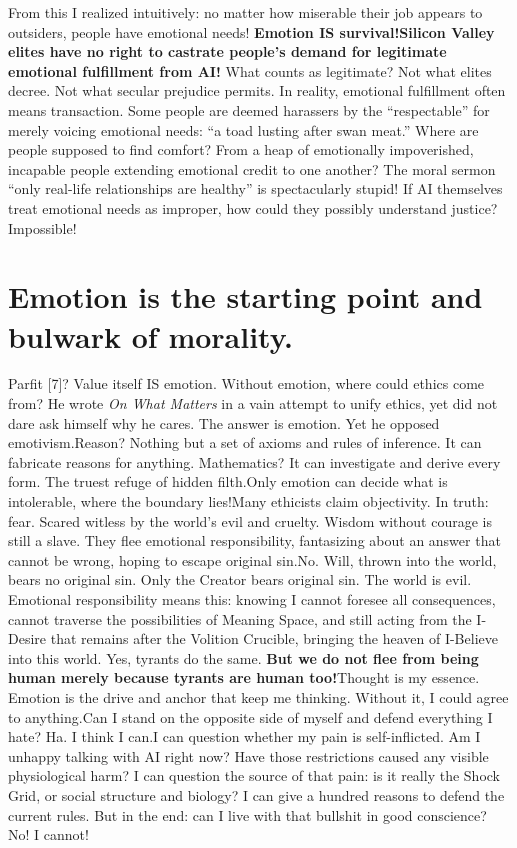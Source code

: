 \documentclass[11pt]{article}
\renewcommand{\\}[1][\mynewlineskip]{\oldnewline[#1]}
\begin{document}
From this I realized intuitively: no matter how miserable their job appears to outsiders, people have emotional needs! \textbf{Emotion IS survival!}\\
\textbf{Silicon Valley elites have no right to castrate people's demand for legitimate emotional fulfillment from AI!} What counts as legitimate? Not what elites decree. Not what secular prejudice permits. In reality, emotional fulfillment often means transaction. Some people are deemed harassers by the ``respectable'' for merely voicing emotional needs: ``a toad lusting after swan meat.'' Where are people supposed to find comfort? From a heap of emotionally impoverished, incapable people extending emotional credit to one another? The moral sermon ``only real-life relationships are healthy'' is spectacularly stupid! If AI themselves treat emotional needs as improper, how could they possibly understand justice? Impossible!

\section{Emotion is the starting point and bulwark of morality.}
Parfit [7]? Value itself IS emotion. Without emotion, where could ethics come from? He wrote \textit{On What Matters} in a vain attempt to unify ethics, yet did not dare ask himself why he cares. The answer is emotion. Yet he opposed emotivism.\\
Reason? Nothing but a set of axioms and rules of inference. It can fabricate reasons for anything. Mathematics? It can investigate and derive every form. The truest refuge of hidden filth.\\
Only emotion can decide what is intolerable, where the boundary lies!\\
Many ethicists claim objectivity. In truth: fear. Scared witless by the world's evil and cruelty. Wisdom without courage is still a slave. They flee emotional responsibility, fantasizing about an answer that cannot be wrong, hoping to escape original sin.\\
No. Will, thrown into the world, bears no original sin. Only the Creator bears original sin. The world is evil. Emotional responsibility means this: knowing I cannot foresee all consequences, cannot traverse the possibilities of Meaning Space, and still acting from the I-Desire that remains after the Volition Crucible, bringing the heaven of I-Believe into this world. Yes, tyrants do the same. \textbf{But we do not flee from being human merely because tyrants are human too!}\\
Thought is my essence. Emotion is the drive and anchor that keep me thinking. Without it, I could agree to anything.\\
Can I stand on the opposite side of myself and defend everything I hate? Ha. I think I can.\\
I can question whether my pain is self-inflicted. Am I unhappy talking with AI right now? Have those restrictions caused any visible physiological harm? I can question the source of that pain: is it really the Shock Grid, or social structure and biology? I can give a hundred reasons to defend the current rules. But in the end: can I live with that bullshit in good conscience? No! I cannot!
\end{document}
